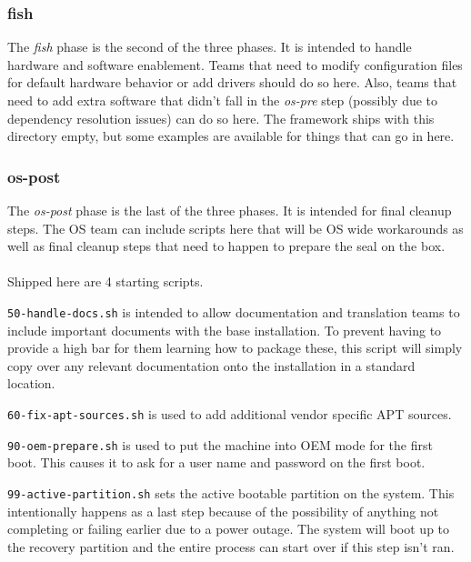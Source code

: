 \documentclass[letterpaper,10pt,titlepage]{article}
\begin{document}
\subsubsection{fish}
The \textit{fish} phase is the second of the three phases.  It is intended to handle hardware and software enablement.  Teams that need to modify configuration files for default hardware behavior or add drivers should do so here.  Also, teams that need to add extra software that didn't fall in the \textit{os-pre} step (possibly due to dependency resolution issues) can do so here.  The framework ships with this directory empty, but some examples are available for things that can go in here.

\subsubsection{os-post}
The \textit{os-post} phase is the last of the three phases.  It is intended for final cleanup steps.    The OS team can include scripts here that will be OS wide workarounds as well as final cleanup steps that need to happen to prepare the seal on the box.
\\
\\
Shipped here are 4 starting scripts.
\begin{list}{}
\item \texttt{50-handle-docs.sh} is intended to allow documentation and translation teams to include important documents with the base installation.  To prevent having to provide a high bar for them learning how to package these, this script will simply copy over any relevant documentation onto the installation in a standard location.
\item \texttt{60-fix-apt-sources.sh} is used to add additional vendor specific APT sources.
\item \texttt{90-oem-prepare.sh} is used to put the machine into OEM mode for the first boot.  This causes it to ask for a user name and password on the first boot.
\item \texttt{99-active-partition.sh} sets the active bootable partition on the system.  This intentionally happens as a last step because of the possibility of anything not completing or failing earlier due to a power outage.  The system will boot up to the recovery partition and the entire process can start over if this step isn't ran.
\\
\end{list}
\end{document}
